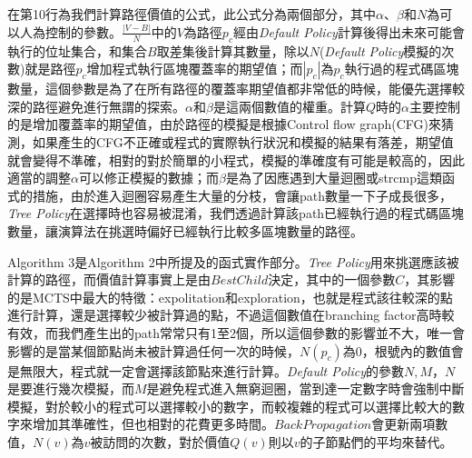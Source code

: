 \documentclass[12pt,a4paper,oneside]{book}
\begin{document}
在第10行為我們計算路徑價值的公式，此公式分為兩個部分，其中$\alpha$、$\beta$和$N$為可以人為控制的參數。$\frac{|V-B|}{N}$中的$V$為路徑$p_c$經由\textit{Default Policy}計算後得出未來可能會執行的位址集合，和集合$B$取差集後計算其數量，除以$N$(\textit{Default Policy}模擬的次數)就是路徑$p_c$增加程式執行區塊覆蓋率的期望值；而$|p_c|$為$p_c$執行過的程式碼區塊數量，這個參數是為了在所有路徑的覆蓋率期望值都非常低的時候，能優先選擇較深的路徑避免進行無謂的探索。$\alpha$和$\beta$是這兩個數值的權重。計算$Q$時的$\alpha$主要控制的是增加覆蓋率的期望值，由於路徑的模擬是根據Control flow graph(CFG)來猜測，如果產生的CFG不正確或程式的實際執行狀況和模擬的結果有落差，期望值就會變得不準確，相對的對於簡單的小程式，模擬的準確度有可能是較高的，因此適當的調整$\alpha$可以修正模擬的數據；而$\beta$是為了因應遇到大量迴圈或strcmp這類函式的措施，由於進入迴圈容易產生大量的分枝，會讓path數量一下子成長很多，\textit{Tree Policy}在選擇時也容易被混淆，我們透過計算該path已經執行過的程式碼區塊數量，讓演算法在挑選時偏好已經執行比較多區塊數量的路徑。

Algorithm 3是Algorithm 2中所提及的函式實作部分。\textit{Tree Policy}用來挑選應該被計算的路徑，而價值計算事實上是由$BestChild$決定，其中的一個參數$C$，其影響的是MCTS中最大的特徵：expolitation和exploration，也就是程式該往較深的點進行計算，還是選擇較少被計算過的點，不過這個數值在branching factor高時較有效，而我們產生出的path常常只有1至2個，所以這個參數的影響並不大，唯一會影響的是當某個節點尚未被計算過任何一次的時候，$N(p_c)$為0，根號內的數值會是無限大，程式就一定會選擇該節點來進行計算。\textit{Default Policy}的參數$N,M$，$N$是要進行幾次模擬，而$M$是避免程式進入無窮迴圈，當到達一定數字時會強制中斷模擬，對於較小的程式可以選擇較小的數字，而較複雜的程式可以選擇比較大的數字來增加其準確性，但也相對的花費更多時間。$BackPropagation$會更新兩項數值，$N(v)$為$v$被訪問的次數，對於價值$Q(v)$則以$v$的子節點們的平均來替代。
\end{document}
